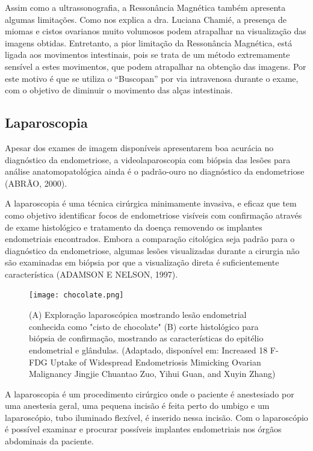 \documentclass[12pt]{article} %
\begin{document}
Assim como a ultrassonografia, a Ressonância Magnética também apresenta algumas limitações. Como nos explica a dra. Luciana Chamié, a presença de miomas e cistos ovarianos muito volumosos podem atrapalhar na visualização das imagens obtidas. Entretanto, a pior limitação da Ressonância Magnética, está ligada aos movimentos intestinais, pois se trata de um método extremamente sensível a estes movimentos, que podem atrapalhar na obtenção das imagens. Por este motivo é que se utiliza o ``Buscopan'' por via intravenosa durante o exame, com o objetivo de diminuir o movimento das alças intestinais.

\subsection{Laparoscopia}

Apesar dos exames de imagem disponíveis apresentarem boa acurácia no diagnóstico da endometriose, a videolaparoscopia com biópsia das lesões para análise anatomopatológica ainda é o padrão-ouro no diagnóstico da endometriose (ABRÃO, 2000).

A laparoscopia é uma técnica cirúrgica minimamente invasiva, e eficaz que tem como objetivo  identificar focos de endometriose visíveis com confirmação através de exame histológico e tratamento da doença removendo os implantes endometriais encontrados. Embora a comparação citológica seja padrão para
o diagnóstico da endometriose, algumas lesões visualizadas durante a
cirurgia não são examinadas em biópsia por que a visualização direta é
suficientemente característica (ADAMSON E NELSON, 1997). 


\begin{figure}[h!]
\centering
\texttt{[image: chocolate.png]}
\caption[Exploração laparoscópica e corte histológico]{(A) Exploração laparoscópica mostrando lesão endometrial conhecida como "cisto de chocolate" (B) corte histológico para biópsia  de confirmação, mostrando as características do epitélio endometrial e glândulas. (Adaptado, disponível em: Increased 18 F-FDG Uptake of Widespread Endometriosis Mimicking Ovarian Malignancy Jingjie Chuantao Zuo, Yihui Guan, and Xuyin Zhang)}
\end{figure}

A laparoscopia é um procedimento cirúrgico onde o paciente é
anestesiado por uma anestesia geral, uma pequena incisão é feita
perto do umbigo e um laparoscópio, tubo iluminado flexível, é inserido
nessa incisão. Com o laparoscópio é possível examinar e procurar
possíveis implantes endometriais nos órgãos abdominais da paciente.
\end{document}
